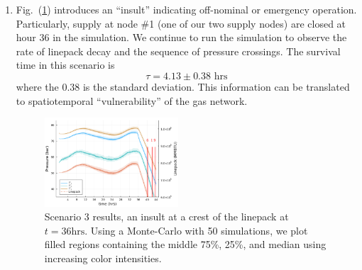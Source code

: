 \begin{enumerate}
    \item Fig.~(\ref{fig:scen3}) introduces an ``insult'' indicating off-nominal or emergency operation.  Particularly, supply at node \#1 (one of our two supply nodes) are closed at hour 36 in the simulation. We continue to run the simulation to observe the rate of linepack decay and the sequence of pressure crossings.
    The survival time in this scenario is
    \begin{equation}
        \tau = 4.13 \pm 0.38 \text{ hrs}
    \end{equation}
    where the $0.38$ is the standard deviation.
    This information can be translated to spatiotemporal ``vulnerability'' of the gas network.
\begin{figure}
    \centering
    \includegraphics[width=0.47\textwidth]{figs/ScenarioResults/scen3.png}
    \caption{Scenario 3 results, an insult at a crest of the linepack at $t=36\text{hrs}$. Using a Monte-Carlo with 50 simulations, we plot filled regions containing the middle 75\%, 25\%, and median using increasing color intensities.}
    \label{fig:scen3}
\end{figure}


\end{enumerate}
